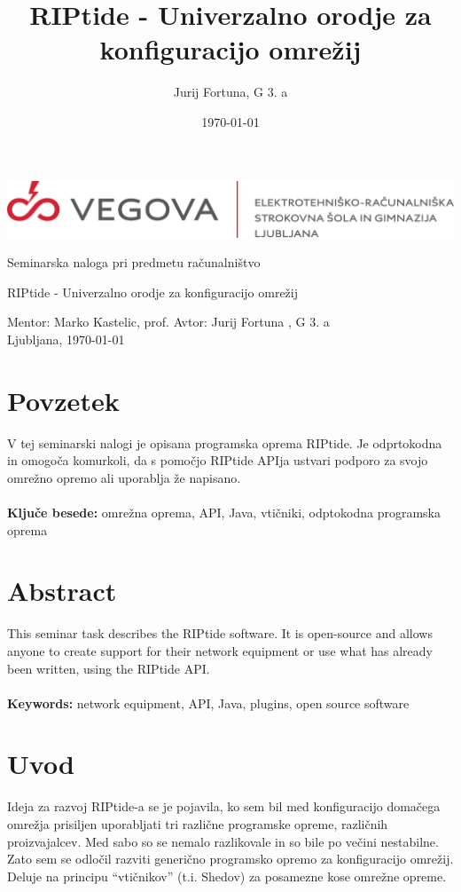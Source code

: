 \documentclass[12pt]{article}
\title{RIPtide - Univerzalno orodje za konfiguracijo omrežij}
\author{Jurij Fortuna, G 3. a}
\date{\MMYYYYdate\today}
\begin{document}
\begin{center}
	\thispagestyle{empty}
	\includegraphics[scale=1]{slike/vegova.png}

	\vspace{\fill}
	Seminarska naloga pri predmetu računalništvo

	\Huge{RIPtide - Univerzalno orodje za konfiguracijo omrežij}

	\normalsize
	\vspace{\fill}

	Mentor: Marko Kastelic, prof. \hfill Avtor: Jurij Fortuna , G 3. a\\
	\null
	Ljubljana, \MMYYYYdate\today
\end{center}
\newpage

\section*{Povzetek}
V tej seminarski nalogi je opisana programska oprema RIPtide. Je odprtokodna
in omogoča komurkoli, da s pomočjo RIPtide APIja ustvari podporo za svojo
omrežno opremo ali uporablja že napisano.\\\\
\textbf{Ključe besede:} omrežna oprema, API, Java, vtičniki, odptokodna
programska oprema\\

\section*{Abstract}
\foreignlanguage{english}{
	This seminar task describes the RIPtide software. It is open-source
	and allows anyone to create support for their network equipment or
	use what has already been written, using the RIPtide API.\\\\
	\textbf{Keywords:} network equipment, API, Java, plugins, open source
	software
}
\newpage

\tableofcontents
\newpage

\section{Uvod}
Ideja za razvoj RIPtide-a se je pojavila, ko sem bil med konfiguracijo
domačega omrežja prisiljen uporabljati tri različne programske opreme,
različnih proizvajalcev. Med sabo so se nemalo razlikovale in so bile
po večini nestabilne. Zato sem se odločil razviti generično programsko
opremo za konfiguracijo omrežij. Deluje na principu
“vtičnikov” (t.i. Shedov) za posamezne kose omrežne opreme.\\\\\\
\end{document}
